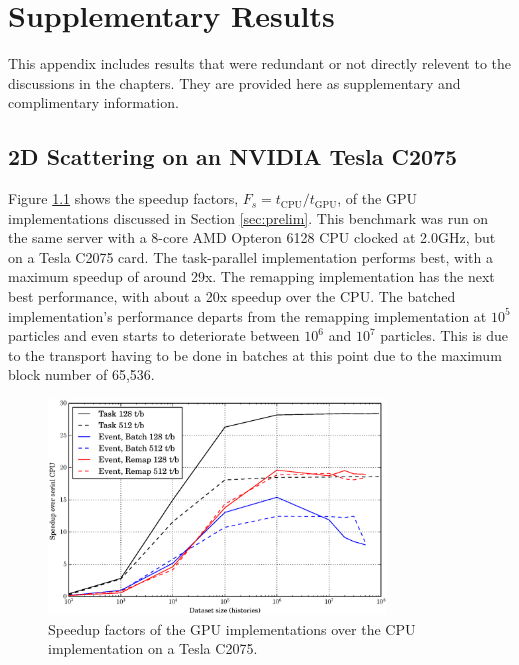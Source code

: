\chapter{Supplementary Results}
\label{app:A}

This appendix includes results that were redundant or not directly relevent to the discussions in the chapters.  They are provided here as supplementary and complimentary information.

\section{2D Scattering on an NVIDIA Tesla C2075}

Figure \ref{prelim_speedup_old} shows the speedup factors, $F_s=t_\mathrm{CPU}/t_\mathrm{GPU}$, of the GPU implementations discussed in Section \ref{sec:prelim}.  This benchmark was run on the same server with a 8-core AMD Opteron 6128 CPU clocked at 2.0GHz, but on a Tesla C2075 card.   The task-parallel implementation performs best, with a maximum speedup of around 29x.  The remapping implementation has the next best performance, with about a 20x speedup over the CPU. The batched implementation's performance departs from the remapping implementation at $10^5$ particles and even starts to deteriorate between $10^6$ and $10^7$ particles.  This is due to the transport having to be done in batches at this point due to the maximum block number of 65,536.  

\begin{figure}[h!] 
  \centering
    \includegraphics[width=0.8\textwidth]{graphics/prelim_speedup_old.eps}
     \caption{Speedup factors of the GPU implementations over the CPU implementation on a Tesla C2075. \label{prelim_speedup_old} }
\end{figure}


